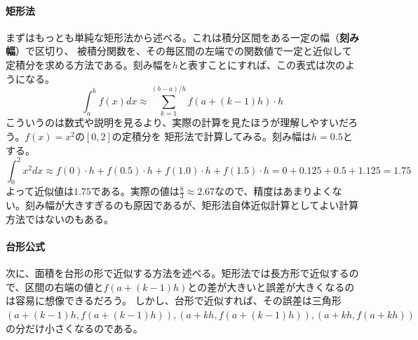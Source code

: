 \documentclass[a4j,dvipdfmx]{jsarticle}
\begin{document}
                \paragraph{矩形法}まずはもっとも単純な矩形法から述べる。これは積分区間をある一定の幅（\textbf{刻み幅}）で区切り、
                被積分関数を、その毎区間の左端での関数値で一定と近似して定積分を求める方法である。刻み幅を$h$と表すことにすれば、この表式は次のようになる。
                \begin{equation}
                    \int_{a}^{b}f(x)dx \approx \sum_{k=1}^{(b-a)/h}f(a+(k-1)h)\cdot h \label{eq:矩形法}
                \end{equation}
                こういうのは数式や説明を見るより、実際の計算を見たほうが理解しやすいだろう。$f(x)=x^2$の$[0,2]$の定積分を
                矩形法で計算してみる。刻み幅は$h=0.5$とする。
                \begin{equation*}
                    \int_{0}^{2}x^2 dx \approx f(0)\cdot h + f(0.5)\cdot h+f(1.0)\cdot h + f(1.5)\cdot h = 0+0.125+0.5+1.125=1.75
                \end{equation*}
                よって近似値は$1.75$である。実際の値は$\frac{8}{3}\approx 2.67$なので、精度はあまりよくない。刻み幅が大きすぎるのも原因であるが、矩形法自体近似計算としてよい計算方法ではないのもある。

                \paragraph{台形公式}次に、面積を台形の形で近似する方法を述べる。矩形法では長方形で近似するので、区間の右端の値と$f(a+(k-1)h)$との差が大きいと誤差が大きくなるのは容易に想像できるだろう。
                しかし、台形で近似すれば、その誤差は三角形$(a+(k-1)h,f(a+(k-1)h)),(a+kh,f(a+(k-1)h)),(a+kh,f(a+kh))$の分だけ小さくなるのである。
                
\end{document}
